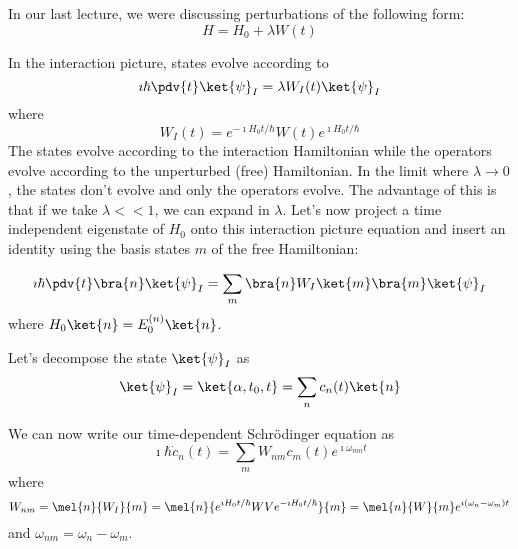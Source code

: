 \documentclass[a4paper,twoside,master.tex]{subfiles}
\begin{document}

In our last lecture, we were discussing perturbations of the following form:
\begin{equation}
    H = H_0 + \lambda W(t)
\end{equation}

In the interaction picture, states evolve according to
\begin{equation}
    \imath \hbar \pdv{t}\ket{\psi}_I = \lambda W_I(t)\ket{\psi}_I
\end{equation}
where
\begin{equation}
    W_I(t) = e^{- \imath H_0 t / \hbar} W(t) e^{\imath H_0 t / \hbar}
\end{equation}
The states evolve according to the interaction Hamiltonian while the operators evolve according to the unperturbed (free) Hamiltonian. In the limit where $ \lambda \to 0 $, the states don't evolve and only the operators evolve. The advantage of this is that if we take $ \lambda << 1 $, we can expand in $ \lambda $. Let's now project a time independent eigenstate of $ H_0 $ onto this interaction picture equation and insert an identity using the basis states $ m $ of the free Hamiltonian:

\begin{equation}
    \imath \hbar \pdv{t}\bra{n}\ket{\psi}_I = \sum_m\bra{n} W_I\ket{m}\bra{m}\ket{\psi}_I
\end{equation}
where $ H_0\ket{n} = E_0^{(n)}\ket{n} $.

Let's decompose the state $\ket{\psi}_I $ as
\begin{equation}
    \ket{\psi}_I =\ket{\alpha, t_0, t} = \sum_n c_n(t)\ket{n}
\end{equation}

We can now write our time-dependent Schr\"odinger equation as
\begin{equation}
    \imath \hbar \dot{c}_n(t) = \sum_m W_{nm} c_m(t) e^{\imath \omega_{mn} t}
\end{equation}
where
\begin{equation}
    W_{nm} = \mel{n}{W_I}{m} = \mel{n}{e^{\imath H_0 t / \hbar}WV e^{- \imath H_0 t/ \hbar}}{m} = \mel{n}{W}{m} e^{\imath (\omega_n - \omega_m) t}
\end{equation}
and $ \omega_{nm} = \omega_n - \omega_m $.
\end{document}
